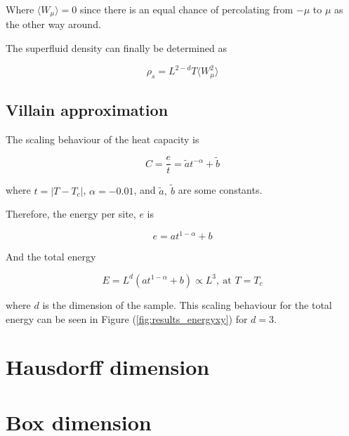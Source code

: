 Where $\langle W_\mu \rangle = 0$ since there is an equal chance of percolating from $-\mu$ to $\mu$ as the other way around.

The superfluid density can finally be determined as

\begin{equation}
    \rho_s = L^{2 - d} T \langle W_\mu^2 \rangle 
\end{equation}

\subsection{Villain approximation}
\label{subsec:villainApprox}


The scaling behaviour of the heat capacity is%

\begin{equation}
    C = \frac{e}{t} = \tilde a t^{-\alpha} + \tilde b
\end{equation}

where $t = |T - T_c|$, $\alpha = -0.01$, and $\tilde a, \ \tilde b$ are some constants.

Therefore, the energy per site, $e$ is

\begin{equation}
    e = a t^{1 - \alpha} + b
\end{equation}

And the total energy

\begin{equation}
    E = L^d ( a t^{1 - \alpha} + b ) \propto L^3, \ \text{at $T = T_c$}
\end{equation}

where $d$ is the dimension of the sample. This scaling behaviour for the total energy can be seen in Figure (\ref{fig:results_energyxy}) for $d = 3$.

\section{Hausdorff dimension}
\label{sec:hausdorffdimension}


\section{Box dimension}
\label{sec:boxdimension}

